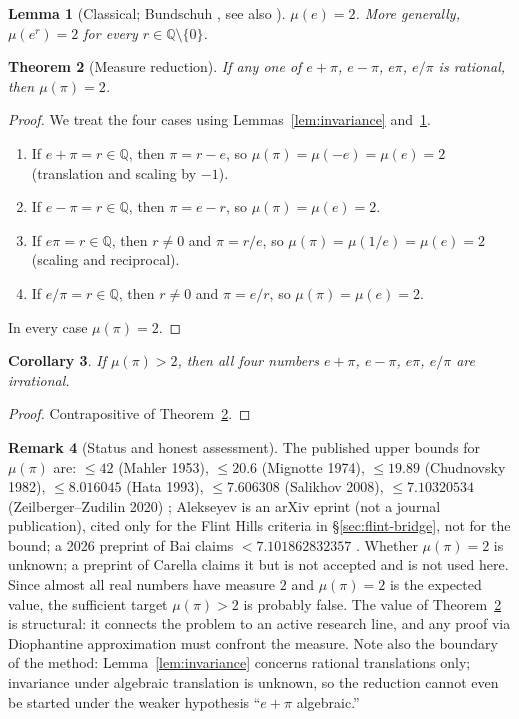 \documentclass[11pt]{amsart}
\newtheorem{theorem}{Theorem}[section]
\newtheorem{lemma}[theorem]{Lemma}
\newtheorem{corollary}[theorem]{Corollary}
\theoremstyle{definition}
\newtheorem{remark}[theorem]{Remark}
\theoremstyle{remark}
\numberwithin{equation}{section}
\newcommand{\Q}{\mathbb{Q}}
\newcommand{\irr}{\mu}
\newcommand{\ee}{e}
\begin{document}
\begin{lemma}[Classical; Bundschuh {\cite{Bundschuh1971}}, see also {\cite{CNU2024}}]\label{lem:mue}
$\irr(\ee)=2$. More generally, $\irr(\ee^r)=2$ for every $r\in\Q\setminus\{0\}$.
\end{lemma}

\begin{theorem}[Measure reduction]\label{thm:measure-reduction}
If any one of $e+\pi$, $e-\pi$, $e\pi$, $e/\pi$ is rational, then $\irr(\pi)=2$.
\end{theorem}

\begin{proof}
We treat the four cases using Lemmas~\ref{lem:invariance} and~\ref{lem:mue}.
\begin{enumerate}
\item If $e+\pi=r\in\Q$, then $\pi=r-e$, so $\irr(\pi)=\irr(-e)=\irr(e)=2$ (translation and scaling by $-1$).
\item If $e-\pi=r\in\Q$, then $\pi=e-r$, so $\irr(\pi)=\irr(e)=2$.
\item If $e\pi=r\in\Q$, then $r\ne0$ and $\pi=r/e$, so $\irr(\pi)=\irr(1/e)=\irr(e)=2$ (scaling and reciprocal).
\item If $e/\pi=r\in\Q$, then $r\ne0$ and $\pi=e/r$, so $\irr(\pi)=\irr(e)=2$.
\end{enumerate}
In every case $\irr(\pi)=2$.
\end{proof}

\begin{corollary}\label{cor:four-irrational}
If $\irr(\pi)>2$, then all four numbers $e+\pi$, $e-\pi$, $e\pi$, $e/\pi$ are irrational.
\end{corollary}

\begin{proof}
Contrapositive of Theorem~\ref{thm:measure-reduction}.
\end{proof}

\begin{remark}[Status and honest assessment]
The published upper bounds for $\irr(\pi)$ are: $\le42$ (Mahler 1953), $\le20.6$ (Mignotte 1974), $\le19.89$ (Chudnovsky 1982), $\le8.016045$ (Hata 1993), $\le7.606308$ (Salikhov 2008), $\le7.10320534$ (Zeilberger--Zudilin 2020) \cite{ZZ2020}; Alekseyev \cite{Alekseyev2011} is an arXiv eprint (not a journal publication), cited only for the Flint Hills criteria in \S\ref{sec:flint-bridge}, not for the bound; a 2026 preprint of Bai claims $<7.101862832357$ \cite{Bai2026}. Whether $\irr(\pi)=2$ is unknown; a preprint of Carella claims it \cite{CarellaMeasure} but is not accepted and is not used here. Since almost all real numbers have measure $2$ and $\irr(\pi)=2$ is the expected value, the sufficient target $\irr(\pi)>2$ is probably false. The value of Theorem~\ref{thm:measure-reduction} is structural: it connects the problem to an active research line, and any proof via Diophantine approximation must confront the measure. Note also the boundary of the method: Lemma~\ref{lem:invariance} concerns rational translations only; invariance under algebraic translation is unknown, so the reduction cannot even be started under the weaker hypothesis ``$e+\pi$ algebraic.''
\end{remark}
\end{document}
